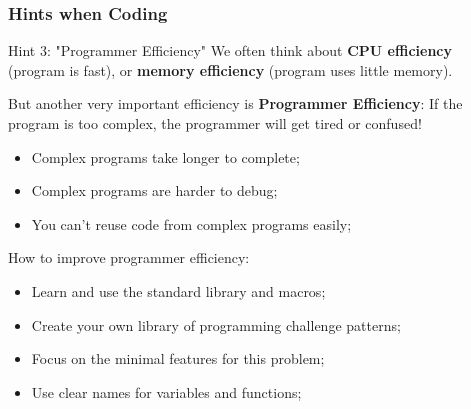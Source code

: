 \begin{frame}
  \frametitle{Hints when Coding}

  \begin{block}{Hint 3: "Programmer Efficiency"}
    We often think about {\bf CPU efficiency} (program is fast), or {\bf memory efficiency} (program uses little memory).
    \bigskip

    But another very important efficiency is {\bf Programmer Efficiency}: If the program is too complex, the programmer will get tired or confused!
    \begin{itemize}
      \item Complex programs take longer to complete;
      \item Complex programs are harder to debug;
      \item You can't reuse code from complex programs easily;
    \end{itemize}
  \end{block}
  How to improve programmer efficiency:
  \begin{itemize}
  \item Learn and use the standard library and macros;
  \item Create your own library of programming challenge patterns;
  \item Focus on the minimal features for this problem;
  \item Use clear names for variables and functions;
  \end{itemize}
\end{frame}


